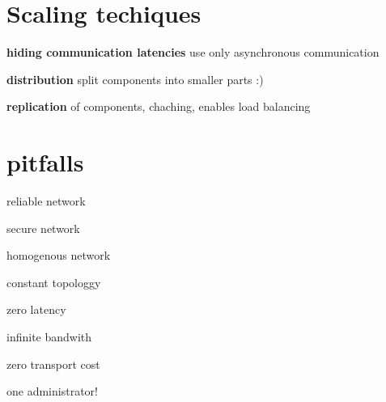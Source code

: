 \documentclass[ngerman,a4paper]{report}
\begin{document}
\section{Scaling techiques}
\begin{compactitem}
\item [\textbf{hiding communication latencies}] use only asynchronous communication
\item [\textbf{distribution}] split components into smaller parts :)
\item [\textbf{replication}] of components, chaching, enables load balancing
\end{compactitem}

\section{pitfalls}

\begin{compactenum}
\item reliable network
\item secure network
\item homogenous network
\item constant topologgy
\item zero latency
\item infinite bandwith
\item zero transport cost
\item one administrator!
\end{compactenum}
\end{document}
